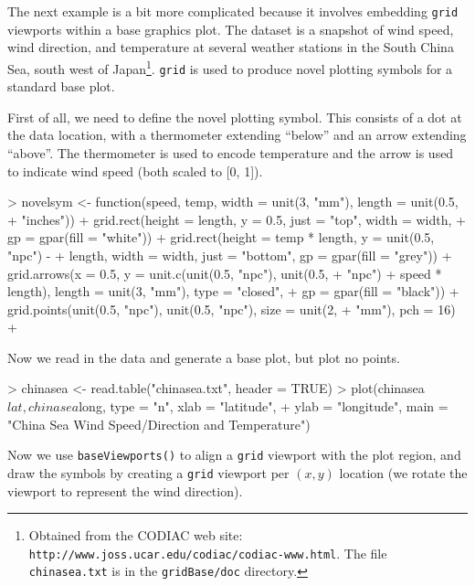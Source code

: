 \documentclass[a4paper]{article}
\newcommand{\grid}{{\tt grid}}
\begin{document}
The next example is a bit more complicated because it involves 
embedding \grid{} viewports within a base graphics plot.
The dataset is a snapshot of wind speed, wind direction, and temperature
at several weather stations in the South China Sea, south west of 
Japan\footnote{Obtained from the CODIAC web site:
{\tt http://www.joss.ucar.edu/codiac/codiac-www.html}.  The file
{\tt chinasea.txt} is in the {\tt gridBase/doc} directory.}.
\grid{} is used to produce novel plotting symbols for a standard
base plot.

First of all, we need to define the novel plotting symbol.  This consists
of a dot at the data location, with a thermometer extending ``below''
and an arrow extending ``above''.  The thermometer is used to encode 
temperature 
and the arrow is used to indicate wind speed 
(both scaled to [0, 1]).

\begin{Schunk}
\begin{Sinput}
> novelsym <- function(speed, temp, width = unit(3, "mm"), length = unit(0.5, 
+     "inches")) {
+     grid.rect(height = length, y = 0.5, just = "top", width = width, 
+         gp = gpar(fill = "white"))
+     grid.rect(height = temp * length, y = unit(0.5, "npc") - 
+         length, width = width, just = "bottom", gp = gpar(fill = "grey"))
+     grid.arrows(x = 0.5, y = unit.c(unit(0.5, "npc"), unit(0.5, 
+         "npc") + speed * length), length = unit(3, "mm"), type = "closed", 
+         gp = gpar(fill = "black"))
+     grid.points(unit(0.5, "npc"), unit(0.5, "npc"), size = unit(2, 
+         "mm"), pch = 16)
+ }
\end{Sinput}
\end{Schunk}
Now we read in the data and generate a base plot, but plot no points.

\begin{Schunk}
\begin{Sinput}
> chinasea <- read.table("chinasea.txt", header = TRUE)
> plot(chinasea$lat, chinasea$long, type = "n", xlab = "latitude", 
+     ylab = "longitude", main = "China Sea Wind Speed/Direction and Temperature")
\end{Sinput}
\end{Schunk}
Now we use \verb|baseViewports()| to align a \grid{} viewport
with the plot region, and draw the symbols by creating a 
\grid{} viewport per $(x, y)$ location (we rotate the viewport to
represent the wind direction).
\end{document}
